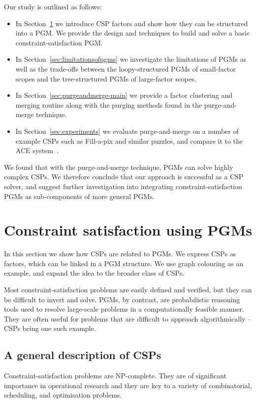 \documentclass{ieeeaccess}
\begin{document}
Our study is outlined as follows:
\begin{itemize}
	\item
	In Section~\ref{sec-CSP} we introduce CSP factors and show how they can be structured into a PGM. We provide the design and techniques to build and solve a basic constraint-satisfaction PGM.
	
	\item
	In Section~\ref{sec:limitationsofpgms} we investigate the limitations of PGMs as well as the trade-offs between the loopy-structured PGMs of small-factor scopes and the tree-structured PGMs of large-factor scopes.
	
	\item
	In Section~\ref{sec:purgeandmerge-main} we provide a factor clustering and merging routine along with the purging methods found in the purge-and-merge technique.
	
	\item
	In Section~\ref{sec:experiments} we evaluate purge-and-merge on a number of example CSPs such as Fill-a-pix and similar puzzles, and compare it to the ACE system~\cite{acewebsite}.
\end{itemize}

We found that with the purge-and-merge technique, PGMs can solve highly complex CSPs. We therefore conclude that our approach is successful as a CSP solver, and suggest further investigation into integrating constraint-satisfaction PGMs as sub-components of more general PGMs.


\section{Constraint satisfaction using PGMs}\label{sec-CSP}

In this section we show how CSPs are related to PGMs. We express CSPs as factors, which can be linked in a PGM structure. We use graph colouring as an example, and expand the idea to the broader class of CSPs.

Most constraint-satisfaction problems are easily defined and verified, but they can be difficult to invert and solve. PGMs, by contrast, are probabilistic reasoning tools used to resolve large-scale problems in a computationally feasible manner. They are often useful for problems that are difficult to approach algorithmically -- CSPs being one such example.

\subsection{A general description of CSPs}
Constraint-satisfaction problems are NP-complete. They are of significant importance in operational research and they are key to a variety of combinatorial, scheduling, and optimisation problems.
\end{document}
